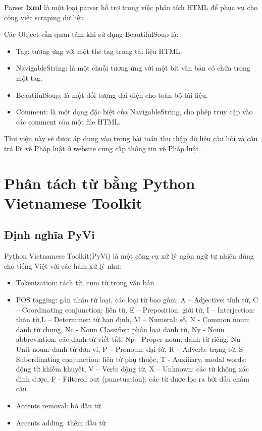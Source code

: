 Parser \textbf{lxml} là một loại parser hỗ trợ trong việc phân tích HTML để phục vụ cho công việc scraping dữ liệu.

Các Object cần quan tâm khi sử dụng BeautifulSoup là:
\begin{itemize}
	\item Tag: tương ứng với một thẻ tag trong tài liệu HTML.
	\item NavigableString: là một chuỗi tương ứng với một bit văn bản có chứa trong một tag.
	\item BeautifulSoup: là một đối tượng đại diện cho toàn bộ tài liệu.
	\item Comment: là một dạng đặc biệt của NavigableString, cho phép truy cập vào các comment của một file HTML.
\end{itemize}

Thư viện này sẽ được áp dụng vào trong bài toán thu thập dữ liệu câu hỏi và câu trả lời về Pháp luật ở website cung cấp thông tin về Pháp luật.
\section{Phân tách từ bằng Python Vietnamese Toolkit}
\subsection{Định nghĩa PyVi}
Python Vietnamese Toolkit(PyVi)\cite{pyvi} là một công cụ xử lý ngôn ngữ tự nhiên dùng cho tiếng Việt với các hàm xử lý như:

\begin{itemize}
	\item Tokenization: tách từ, cụm từ trong văn bản
	\item POS tagging: gán nhãn từ loại, các loại từ bao gồm: A – Adjective: tính từ, C – Coordinating conjunction: liên từ, E – Preposition: giới từ, I – Interjection: thán từ,L – Determiner: từ hạn định, M – Numeral: số, N - Common noun: danh từ chung, Nc - Noun Classifier: phân loại danh từ, Ny - Noun abbreviation: các danh từ viết tắt, Np - Proper noun: danh từ riêng, Nu - Unit noun: danh từ đơn vị, P – Pronoun: đại từ, R – Adverb: trạng từ, S - Subordinating conjunction:  liên từ phụ thuộc, T - Auxiliary, modal words: động từ khiếm khuyết, V – Verb: động từ, X – Unknown: các từ không xác định được, F - Filtered out (punctuation): các từ được lọc ra bởi dấu chấm câu
	\item Accents removal: bỏ dấu từ
	\item Accents adding: thêm dấu từ
	
\end{itemize}

